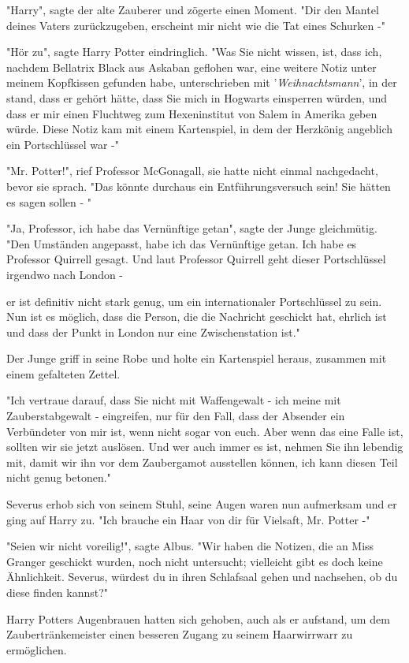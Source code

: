 {"Harry", sagte der alte Zauberer und zögerte einen Moment. "Dir den Mantel deines Vaters zurückzugeben, erscheint mir nicht wie die Tat eines Schurken -"

"Hör zu", sagte Harry Potter eindringlich. "Was Sie nicht wissen, ist, dass ich, nachdem Bellatrix Black aus Askaban geflohen war, eine weitere Notiz unter meinem Kopfkissen gefunden habe, unterschrieben mit '\emph{Weihnachtsmann}', in der stand, dass er gehört hätte, dass Sie mich in Hogwarts einsperren würden, und dass er mir einen Fluchtweg zum Hexeninstitut von Salem in Amerika geben würde. Diese Notiz kam mit einem Kartenspiel, in dem der Herzkönig angeblich ein Portschlüssel war -"

"Mr. Potter!", rief Professor McGonagall, sie hatte nicht einmal nachgedacht, bevor sie sprach. "Das könnte durchaus ein Entführungsversuch sein! Sie hätten es sagen sollen - "

"Ja, Professor, ich habe das Vernünftige getan", sagte der Junge gleichmütig. "Den Umständen angepasst, habe ich das Vernünftige getan. Ich habe es Professor Quirrell gesagt. Und laut Professor Quirrell geht dieser Portschlüssel irgendwo nach London -

er ist definitiv nicht stark genug, um ein internationaler Portschlüssel zu sein. Nun ist es möglich, dass die Person, die die Nachricht geschickt hat, ehrlich ist und dass der Punkt in London nur eine Zwischenstation ist."

Der Junge griff in seine Robe und holte ein Kartenspiel heraus, zusammen mit einem gefalteten Zettel.

"Ich vertraue darauf, dass Sie nicht mit Waffengewalt - ich meine mit Zauberstabgewalt - eingreifen, nur für den Fall, dass der Absender ein Verbündeter von mir ist, wenn nicht sogar von euch. Aber wenn das eine Falle ist, sollten wir sie jetzt auslösen. Und wer auch immer es ist, nehmen Sie ihn lebendig mit, damit wir ihn vor dem Zaubergamot ausstellen können, ich kann diesen Teil nicht genug betonen."

Severus erhob sich von seinem Stuhl, seine Augen waren nun aufmerksam und er ging auf Harry zu. "Ich brauche ein Haar von dir für Vielsaft, Mr. Potter -"

"Seien wir nicht voreilig!", sagte Albus. "Wir haben die Notizen, die an Miss Granger geschickt wurden, noch nicht untersucht; vielleicht gibt es doch keine Ähnlichkeit. Severus, würdest du in ihren Schlafsaal gehen und nachsehen, ob du diese finden kannst?"

Harry Potters Augenbrauen hatten sich gehoben, auch als er aufstand, um dem Zaubertränkemeister einen besseren Zugang zu seinem Haarwirrwarr zu ermöglichen.

}
